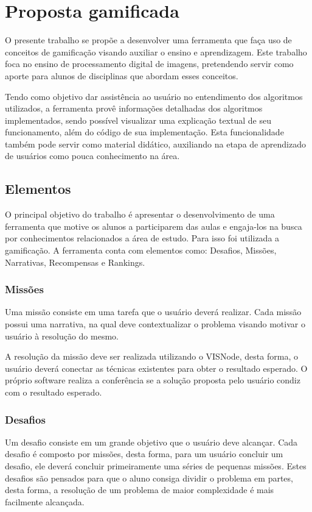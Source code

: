 \documentclass[
	12pt,				%
	oneside,			%
	a4paper,			%
	english,			%
	french,				%
	spanish,			%
	brazil,				%
	]{abntex2}
\begin{document}
\section{Proposta gamificada}

O presente trabalho se propõe a desenvolver uma ferramenta que faça uso de conceitos de gamificação visando auxiliar o ensino e aprendizagem. Este trabalho foca no ensino de processamento digital de imagens, pretendendo servir como aporte para alunos de disciplinas que abordam esses conceitos.

Tendo como objetivo dar assistência ao usuário no entendimento dos algoritmos utilizados, a ferramenta provê informações detalhadas dos algoritmos implementados, sendo possível visualizar uma explicação textual de seu funcionamento, além do código de sua implementação. Esta funcionalidade também pode servir como material didático, auxiliando na etapa de aprendizado de usuários como pouca conhecimento na área.

\subsection{Elementos}

O principal objetivo do trabalho é apresentar o desenvolvimento de uma ferramenta que motive os alunos a participarem das aulas e engaja-los na busca por conhecimentos relacionados a área de estudo. Para isso foi utilizada a gamificação. A ferramenta conta com elementos como: Desafios, Missões, Narrativas, Recompensas e Rankings.

\subsubsection{Missões}

Uma missão consiste em uma tarefa que o usuário deverá realizar. Cada missão possui uma narrativa, na qual deve contextualizar o problema visando motivar o usuário à resolução do mesmo.

A resolução da missão deve ser realizada utilizando o VISNode, desta forma, o usuário deverá conectar as técnicas existentes para obter o resultado esperado. O próprio software realiza a conferência se a solução proposta pelo usuário condiz com o resultado esperado.

\subsubsection{Desafios}
\label{desafio:moedas}
Um desafio consiste em um grande objetivo que o usuário deve alcançar. Cada desafio é composto por missões, desta forma, para um usuário concluir um desafio, ele deverá concluir primeiramente uma séries de pequenas missões. Estes desafios são pensados para que o aluno consiga dividir o problema em partes, desta forma, a resolução de um problema de maior complexidade é mais facilmente alcançada.
\end{document}
